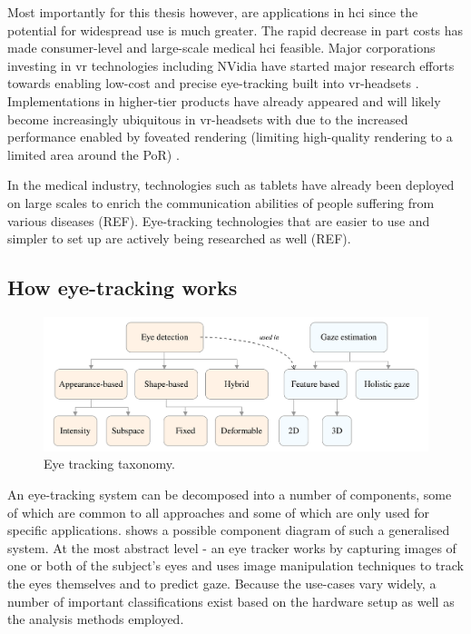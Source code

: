 Most importantly for this thesis however, are applications in \acrfull{hci} since the potential for widespread use is much greater. The rapid decrease in part costs has made consumer-level and large-scale medical \acrlong{hci} feasible. Major corporations investing in \acrfull{vr} technologies including NVidia have started major research efforts towards enabling low-cost and precise eye-tracking built into \acrshort{vr}-headsets \parencite{nvidia-foveated}. Implementations in higher-tier products have already appeared \parencite{vive-eye} and will likely become increasingly ubiquitous in \acrshort{vr}-headsets with due to the increased performance enabled by foveated rendering (limiting high-quality rendering to a limited area around the PoR) \parencite{nvidia-foveated}.

 In the medical industry, technologies such as tablets have already been deployed on large scales to enrich the communication abilities of people suffering from various diseases (REF). Eye-tracking technologies that are easier to use and simpler to set up are actively being researched as well (REF). 

\subsection{How eye-tracking works}
\begin{figure}
	\includegraphics[width=1\textwidth]{figures/model/taxonomy}
	\caption{Eye tracking taxonomy.}\label{fig:taxonomy}
\end{figure}
An eye-tracking system can be decomposed into a number of components, some of which are common to all approaches and some of which are only used for specific applications.  shows a possible component diagram of such a generalised system. At the most abstract level - an eye tracker works by capturing images of one or both of the subject's eyes and uses image manipulation techniques to track the eyes themselves and to predict gaze. Because the use-cases vary widely, a number of important classifications exist based on the hardware setup as well as the analysis methods employed.

